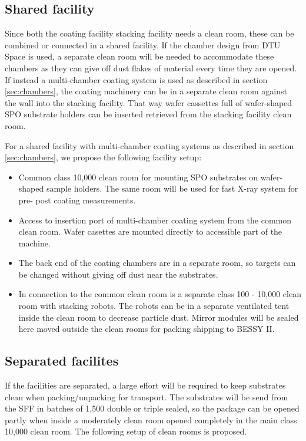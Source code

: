 \subsection{Shared facility}
Since both the coating facility stacking facility needs a clean room, these can be combined or connected in a shared facility. If the chamber design from DTU Space is used, a separate clean room will be needed to accommodate these chambers as they can give off dust flakes of material every time they are opened. If instead a multi-chamber coating system is used as described in section \ref{sec:chambers}, the coating machinery can be in a separate clean room against the wall into the stacking facility. That way wafer cassettes full of wafer-shaped SPO substrate holders can be inserted retrieved from the stacking facility clean room.

For a shared facility with multi-chamber coating systems as described in section \ref{sec:chambers}, we propose the following facility setup:

\begin{itemize}
	\item Common class 10,000 clean room for mounting SPO substrates on wafer-shaped sample holders. The same room will be used for fast X-ray system for pre- post coating measurements.
	\item Access to insertion port of multi-chamber coating system from the common clean room. Wafer casettes are mounted directly to accessible part of the machine.
	\item The back end of the coating chambers are in a separate room, so targets can be changed without giving off dust near the substrates.
	\item In connection to the common clean room is a separate class 100 - 10,000 clean room with stacking robots. The robots can be in a separate ventilated tent inside the clean room to decrease particle dust. Mirror modules will be sealed here moved outside the clean rooms for packing shipping to BESSY II.
\end{itemize}

\subsection{Separated facilites}
If the facilities are separated, a large effort will be required to keep substrates clean when packing/unpacking for transport. The substrates will be send from the SFF in batches of 1,500 double or triple sealed, so the package can be opened partly when inside a moderately clean room opened completely in the main class 10,000 clean room. The following setup of clean rooms is proposed.

